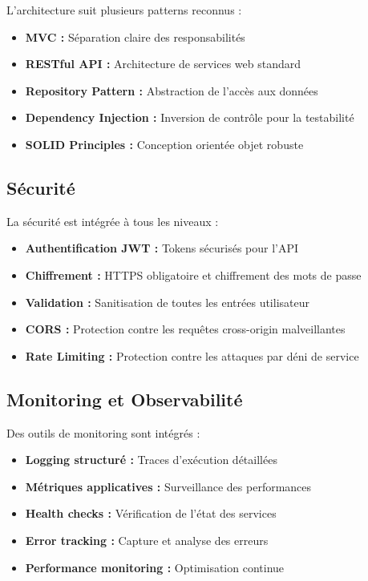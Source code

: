 L'architecture suit plusieurs patterns reconnus :

\begin{itemize}
    \item \textbf{MVC :} Séparation claire des responsabilités
    \item \textbf{RESTful API :} Architecture de services web standard
    \item \textbf{Repository Pattern :} Abstraction de l'accès aux données
    \item \textbf{Dependency Injection :} Inversion de contrôle pour la testabilité
    \item \textbf{SOLID Principles :} Conception orientée objet robuste
\end{itemize}

\subsection{Sécurité}

La sécurité est intégrée à tous les niveaux :

\begin{itemize}
    \item \textbf{Authentification JWT :} Tokens sécurisés pour l'API
    \item \textbf{Chiffrement :} HTTPS obligatoire et chiffrement des mots de passe
    \item \textbf{Validation :} Sanitisation de toutes les entrées utilisateur
    \item \textbf{CORS :} Protection contre les requêtes cross-origin malveillantes
    \item \textbf{Rate Limiting :} Protection contre les attaques par déni de service
\end{itemize}

\subsection{Monitoring et Observabilité}

Des outils de monitoring sont intégrés :

\begin{itemize}
    \item \textbf{Logging structuré :} Traces d'exécution détaillées
    \item \textbf{Métriques applicatives :} Surveillance des performances
    \item \textbf{Health checks :} Vérification de l'état des services
    \item \textbf{Error tracking :} Capture et analyse des erreurs
    \item \textbf{Performance monitoring :} Optimisation continue
\end{itemize}

